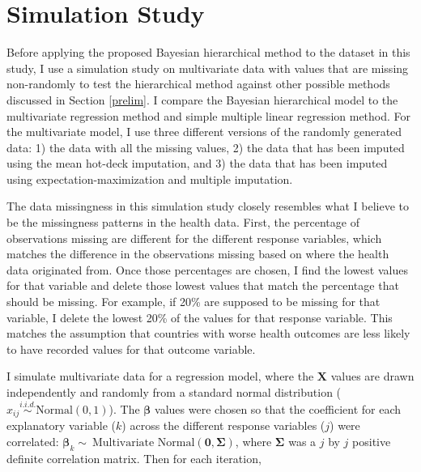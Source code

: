 \section{Simulation Study}

Before applying the proposed Bayesian hierarchical method to the dataset in this study, I use a simulation study on multivariate data with values that are missing non-randomly to test the hierarchical method against other possible methods discussed in Section \ref{prelim}. I compare the Bayesian hierarchical model to the multivariate regression method and simple multiple linear regression method. For the multivariate model, I use three different versions of the randomly generated data: 1) the data with all the missing values, 2) the data that has been imputed using the mean hot-deck imputation, and 3) the data that has been imputed using expectation-maximization and multiple imputation. 

The data missingness in this simulation study closely resembles what I believe to be the missingness patterns in the health data. First, the percentage of observations missing are different for the different response variables, which matches the difference in the observations missing based on where the health data originated from. Once those percentages are chosen, I find the lowest values for that variable and delete those lowest values that match the percentage that should be missing. For example, if 20\% are supposed to be missing for that variable, I delete the lowest 20\% of the values for that response variable. This matches the assumption that countries with worse health outcomes are less likely to have recorded values for that outcome variable.

I simulate multivariate data for a regression model, where the $\mathbf{X}$ values are drawn independently and randomly from a standard normal distribution ($x_{ij} \stackrel{i.i.d.}{\sim} \text{Normal}(0,1)$). The $\boldsymbol{\beta}$ values were chosen so that the coefficient for each explanatory variable ($k$) across the different response variables ($j$) were correlated: $\boldsymbol{\beta}_k \sim\ \text{Multivariate Normal}(\mathbf{0},\boldsymbol{\Sigma})$, where $\boldsymbol{\Sigma}$ was a $j$ by $j$ positive definite correlation matrix. Then for each iteration, 

